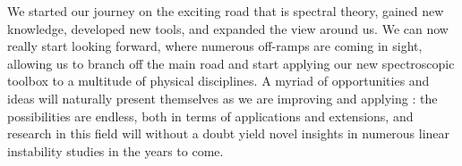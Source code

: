 We started our journey on the exciting road that is spectral theory, gained new knowledge, developed new tools, and expanded the view around us. We can now really start looking forward, where numerous off-ramps are coming in sight, allowing us to branch off the main road and start applying our new spectroscopic toolbox to a multitude of physical disciplines. A myriad of opportunities and ideas will naturally present themselves as we are improving and applying {\legolas}: the possibilities are endless, both in terms of applications and extensions, and research in this field will without a doubt yield novel insights in numerous linear instability studies in the years to come.





\cleardoublepage
